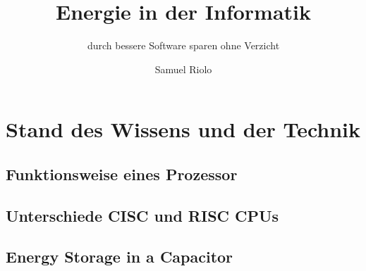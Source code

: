 \documentclass{../template/ffhsthesis}
\begin{document}



\title{Energie in der Informatik}
\subtitle{ durch bessere Software sparen ohne Verzicht} %
\author{Samuel Riolo}


\maketitle




\tableofcontents



\startThesis %


\addtolength{\parskip}{\baselineskip}
\parindent 0pt 











\chapter{Stand des Wissens und der Technik}
\section{Funktionsweise eines Prozessor}
\section{Unterschiede CISC und RISC CPUs}
\section{Energy Storage in a Capacitor}
\end{document}
